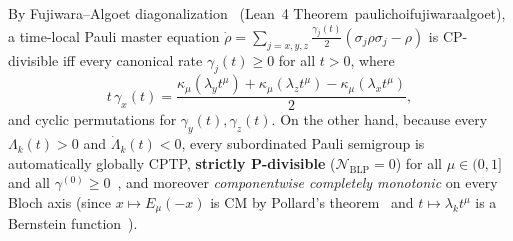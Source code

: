 \documentclass[twocolumn,10pt,amsmath,amssymb,floatfix]{revtex4-2}
\theoremstyle{plain}
\theoremstyle{definition}
\newcommand{\NBLP}{\mathcal{N}_{\mathrm{BLP}}}
\newcommand{\leanid}[1]{{\footnotesize\ttfamily\def\_{\textunderscore\penalty0\hspace{0pt}}#1}}
\begin{document}
By Fujiwara--Algoet diagonalization~\cite{Fujiwara1999PRA} (Lean~4 Theorem~\leanid{pauli\_choi\_fujiwara\_algoet}), a time-local Pauli master equation $\dot{\rho} = \sum_{j=x,y,z} \frac{\gamma_j(t)}{2}(\sigma_j\rho\sigma_j - \rho)$ is CP-divisible iff every canonical rate $\gamma_j(t) \ge 0$ for all $t > 0$, where
\begin{equation}
\label{eq:pauli_rates_inv}
t\,\gamma_x(t) = \frac{\kappa_\mu(\lambda_y t^\mu) + \kappa_\mu(\lambda_z t^\mu) - \kappa_\mu(\lambda_x t^\mu)}{2},
\end{equation}
and cyclic permutations for $\gamma_y(t), \gamma_z(t)$. On the other hand, because every $\Lambda_k(t) > 0$ and $\dot{\Lambda}_k(t) < 0$, every subordinated Pauli semigroup is automatically globally CPTP, \textbf{strictly P-divisible} ($\NBLP = 0$) for all $\mu \in (0,1]$ and all $\gamma^{(0)} \ge 0$~\cite{Chruscinski2014PRL,Chruscinski2015PRA}, and moreover \emph{componentwise completely monotonic} on every Bloch axis (since $x \mapsto E_\mu(-x)$ is CM by Pollard's theorem~\cite{Pollard1948BAMS} and $t \mapsto \lambda_k t^\mu$ is a Bernstein function~\cite{Schilling2012Book}).
\end{document}
